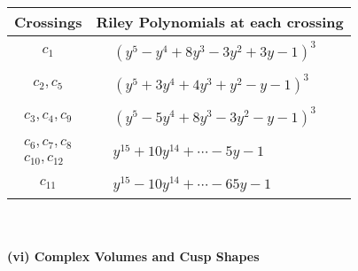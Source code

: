 \documentclass[1p]{elsarticle_modified}
\theoremstyle{definition}
\begin{document}
\begin{tabular}{m{50pt}|m{274pt}}
Crossings & \hspace{64pt}Riley Polynomials at each crossing \\
\hline $$\begin{aligned}c_{1}\end{aligned}$$&$\begin{aligned}
&(y^5- y^4+8 y^3-3 y^2+3 y-1)^3
\end{aligned}$\\
\hline $$\begin{aligned}c_{2},c_{5}\end{aligned}$$&$\begin{aligned}
&(y^5+3 y^4+4 y^3+y^2- y-1)^3
\end{aligned}$\\
\hline $$\begin{aligned}c_{3},c_{4},c_{9}\end{aligned}$$&$\begin{aligned}
&(y^5-5 y^4+8 y^3-3 y^2- y-1)^3
\end{aligned}$\\
\hline $$\begin{aligned}c_{6},c_{7},c_{8}\\c_{10},c_{12}\end{aligned}$$&$\begin{aligned}
&y^{15}+10 y^{14}+\cdots-5 y-1
\end{aligned}$\\
\hline $$\begin{aligned}c_{11}\end{aligned}$$&$\begin{aligned}
&y^{15}-10 y^{14}+\cdots-65 y-1
\end{aligned}$\\
\hline
\end{tabular}\\~\\
\newpage\flushleft \textbf{(vi) Complex Volumes and Cusp Shapes}
\end{document}
